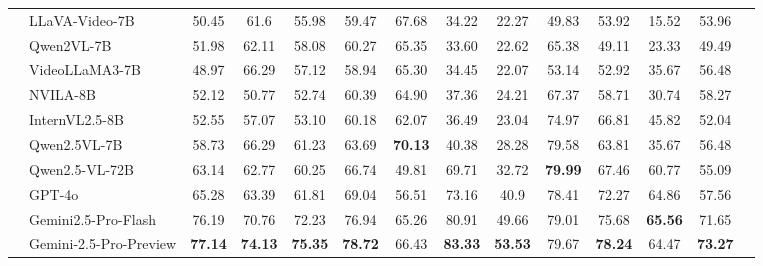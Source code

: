 \begin{table}[!t]
{\begin{tabular}{@{}ll|cccccccccccc@{}}
& LLaVA-Video-7B & 50.45 & 61.6 & 55.98 & 59.47 & 67.68 & 34.22 & \multicolumn{1}{c|}{22.27} & 49.83 & 53.92 & 15.52 &\multicolumn{1}{c|}{53.96} \\
& Qwen2VL-7B & 51.98 & 62.11 & 58.08 & 60.27 & 65.35 & 33.60 & \multicolumn{1}{c|}{22.62} & 65.38 & 49.11 & 23.33 &\multicolumn{1}{c|}{49.49} \\ 
& VideoLLaMA3-7B & 48.97 & 66.29 & 57.12 & 58.94 & 65.30 & 34.45 & \multicolumn{1}{c|}{22.07} & 53.14 & 52.92 & 35.67 &\multicolumn{1}{c|}{56.48}\\
& NVILA-8B & 52.12 & 50.77 & 52.74 & 60.39 & 64.90 & 37.36 & \multicolumn{1}{c|}{24.21} & 67.37 & 58.71 & 30.74 &\multicolumn{1}{c|}{58.27} \\ 
& InternVL2.5-8B & 52.55 & 57.07 & 53.10 & 60.18 & 62.07 & 36.49 & \multicolumn{1}{c|}{23.04} & 74.97 & 66.81 & 45.82 &\multicolumn{1}{c|}{52.04} \\
& Qwen2.5VL-7B & 58.73 & 66.29 & 61.23 & 63.69 & \textbf{70.13} & 40.38 & \multicolumn{1}{c|}{28.28} & 79.58 & 63.81 & 35.67 &\multicolumn{1}{c|}{56.48} \\ 
& Qwen2.5-VL-72B & 63.14 &62.77 &60.25 &66.74 & 49.81 &69.71& \multicolumn{1}{c|}{32.72} & \textbf{79.99} &67.46 &60.77 &\multicolumn{1}{c|}{55.09} \\ 

& GPT-4o &65.28 &63.39 &61.81 &69.04 &56.51 &73.16 &\multicolumn{1}{c|}{40.9} &78.41 &72.27 &64.86 &\multicolumn{1}{c|}{57.56} \\ 
& Gemini2.5-Pro-Flash &76.19 &70.76 &72.23 &76.94 &65.26 &80.91 & \multicolumn{1}{c|}{49.66} &79.01 &75.68 &\textbf{65.56} &\multicolumn{1}{c|}{71.65} \\ 

& Gemini-2.5-Pro-Preview &\textbf{77.14} &\textbf{74.13} &\textbf{75.35} &\textbf{78.72} &66.43 &\textbf{83.33} & \multicolumn{1}{c|}{\textbf{53.53}} &79.67 &\textbf{78.24} &64.47 &\multicolumn{1}{c|}{\textbf{73.27}} \\ 


\end{tabular}}
\end{table}
